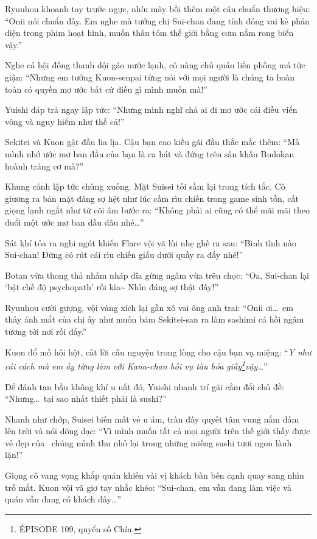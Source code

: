 \documentclass[../main.tex]{subfiles}
\begin{document}
Ryuuhou khoanh tay trước ngực, nhíu mày bồi thêm một câu chuẩn thương hiệu: ``Onii nói chuẩn đấy. Em nghe mà tưởng chị Sui-chan đang tính đóng vai kẻ phản diện trong phim hoạt hình, muốn thâu tóm thế giới bằng cơm nắm rong biển vậy.''

Nghe cả hội đồng thanh dội gáo nước lạnh, cô nàng chủ quán liền phồng má tức giận: ``Nhưng em tưởng Kuon-senpai từng nói với mọi người là chúng ta hoàn toàn có quyền mơ ước bất cứ điều gì mình muốn mà!''

Yuishi đáp trả ngay lập tức: ``Nhưng mình nghĩ chả ai đi mơ ước cái điều viển vông và nguy hiểm như thế cả!''

Sekitei và Kuon gật đầu lia lịa. Cậu bạn cao kiều gãi đầu thắc mắc thêm: ``Mà mình nhớ ước mơ ban đầu của bạn là ca hát và đứng trên sân khấu Budokan hoành tráng cơ mà?''

Khung cảnh lập tức chùng xuống. Mặt Suisei tối sầm lại trong tích tắc. Cô giương ra bản mặt đáng sợ hệt như lúc cầm rìu chiến trong game sinh tồn, cất giọng lạnh ngắt như từ cõi âm bước ra: ``Không phải ai cũng có thể mãi mãi theo đuổi một ước mơ ban đầu đâu nhé\dots''

Sát khí tỏa ra nghi ngút khiến Flare vội vã lùi nhẹ ghế ra sau: ``Bình tĩnh nào Sui-chan! Đừng có rút cái rìu chiến giấu dưới quầy ra đấy nhé!''

Botan vừa thong thả nhấm nháp đĩa gừng ngâm vừa trêu chọc: ``Oa, Sui-chan lại `bật chế độ psychopath' rồi kìa\~{} Nhìn đáng sợ thật đấy!''

Ryuuhou cười gượng, vội vàng xích lại gần xô vai ông anh trai: ``Onii ơi\dots\ em thấy ánh mắt của chị ấy như muốn băm Sekitei-san ra làm sashimi cá hồi ngâm tương tới nơi rồi đấy.''

Kuon đổ mồ hôi hột, cất lời cầu nguyện trong lòng cho cậu bạn vạ miệng: ``\textit{Y như cái cách mà em ấy từng làm với Kana-chan hồi vụ tàu hỏa giấy\footnote{{ÉPISODE 109}, quyển số Chín.}vậy\dots}''

Để đánh tan bầu không khí u uất đó, Yuishi nhanh trí gãi cằm đổi chủ đề: ``Nhưng\dots\ tại sao nhất thiết phải là sushi?''

Nhanh như chớp, Suisei biến mất vẻ u ám, tràn đầy quyết tâm vung nắm đấm lên trời và nói dõng dạc: ``Vì mình muốn tất cả mọi người trên thế giới thấy được vẻ đẹp của \hll\ chúng mình thu nhỏ lại trong những miếng sushi tươi ngon lành lặn!''

Giọng cô vang vọng khắp quán khiến vài vị khách bàn bên cạnh quay sang nhìn trố mắt. Kuon vội vã giơ tay nhắc khéo: ``Sui-chan, em vẫn đang làm việc và quán vẫn đang có khách đấy\dots''
\end{document}
